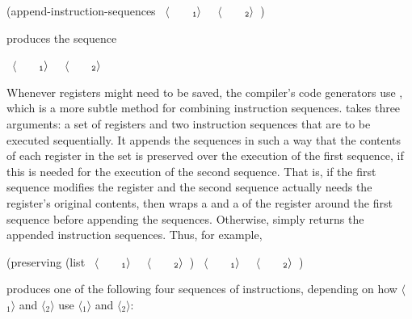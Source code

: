 \begin{codeBlock}
(append-instruction-sequences ~\(\langle \)~~~~\(_{\mono{1}}\rangle \)~ ~\(\langle \)~~~~\(_{\mono{2}}\rangle \)~)
\end{codeBlock}

\noindent
produces the sequence

\begin{codeBlock}
~\(\langle \)~~~~\(_{\mono{1}}\rangle \)~
~\(\langle \)~~~~\(_{\mono{2}}\rangle \)~
\end{codeBlock}

\noindent
Whenever registers might need to be saved, the compiler's code generators use
, which is a more subtle method for combining instruction
sequences.   takes three arguments: a set of registers and two
instruction sequences that are to be executed sequentially.  It appends the
sequences in such a way that the contents of each register in the set is
preserved over the execution of the first sequence, if this is needed for the
execution of the second sequence.  That is, if the first sequence modifies the
register and the second sequence actually needs the register's original
contents, then  wraps a  and a  of
the register around the first sequence before appending the sequences.
Otherwise,  simply returns the appended instruction sequences.
Thus, for example,

\begin{codeBlock}
(preserving (list ~\(\langle \)~~~~\(_{\mono{1}}\rangle \)~ ~\(\langle \)~~~~\(_{\mono{2}}\rangle \)~) ~\(\langle \)~~~~\(_{\mono{1}}\rangle \)~ ~\(\langle \)~~~~\(_{\mono{2}}\rangle \)~)
\end{codeBlock}

\noindent
produces one of the following four sequences of instructions, depending on how
\( \langle \)\( _1\rangle \) and \( \langle \)\( _2\rangle \) use \( \langle \)\( _1\rangle \) and \( \langle \)\( _2\rangle \):

